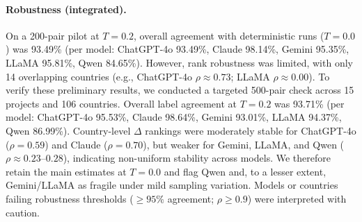 \paragraph{Robustness (integrated).}
On a 200-pair pilot at $T=0.2$, overall agreement with deterministic runs ($T=0.0$) was 93.49\% (per model: ChatGPT-4o 93.49\%, Claude 98.14\%, Gemini 95.35\%, LLaMA 95.81\%, Qwen 84.65\%).
However, rank robustness was limited, with only 14 overlapping countries (e.g., ChatGPT-4o $\rho \approx 0.73$; LLaMA $\rho \approx 0.00$).
To verify these preliminary results, we conducted a targeted 500-pair check across 15 projects and 106 countries.
Overall label agreement at $T=0.2$ was 93.71\% (per model: ChatGPT-4o 95.53\%, Claude 98.64\%, Gemini 93.01\%, LLaMA 94.37\%, Qwen 86.99\%).
Country-level $\Delta$ rankings were moderately stable for ChatGPT-4o ($\rho = 0.59$) and Claude ($\rho = 0.70$), but weaker for Gemini, LLaMA, and Qwen ($\rho \approx 0.23$--$0.28$), indicating non-uniform stability across models.
We therefore retain the main estimates at $T=0.0$ and flag Qwen and, to a lesser extent, Gemini/LLaMA as fragile under mild sampling variation.
Models or countries failing robustness thresholds ($\ge 95\%$ agreement; $\rho \ge 0.9$) were interpreted with caution.
